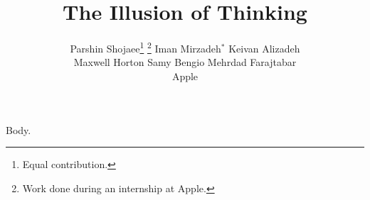 \documentclass{article}
\title{The Illusion of Thinking}
\author{%
  Parshin Shojaee\thanks{Equal contribution.} \thanks{Work done during an internship at Apple.} \hspace{0.5cm}
  Iman Mirzadeh$^{*}$
  \hspace{0.5cm}
  Keivan Alizadeh  \hspace{0.5cm} \\
  Maxwell Horton \hspace{0.5cm}
  Samy Bengio \hspace{0.5cm}
  Mehrdad Farajtabar \\[0.5cm]
Apple
}
\begin{document}
\maketitle
Body.
\end{document}
